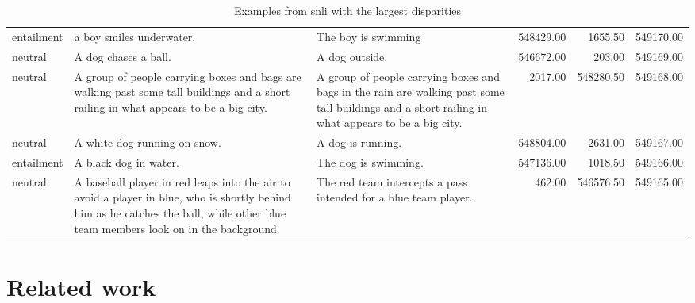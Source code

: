 \documentclass[letterpaper]{article} %
\begin{document}
\begin{table*}[ht]
\begin{tabular}{lp{4cm}p{4cm}rrr}
		entailment & a boy smiles underwater. & The boy is swimming & 548429.00 & 1655.50 & 549170.00 \\ 
		neutral & A dog chases a ball. & A dog outside. & 546672.00 & 203.00 & 549169.00 \\ 
		neutral & A group of people carrying boxes and bags are walking past some tall buildings and a short railing in what appears to be a big city. & A group of people carrying boxes and bags in the rain are walking past some tall buildings and a short railing in what appears to be a big city. & 2017.00 & 548280.50 & 549168.00 \\ 
		neutral & A white dog running on snow. & A dog is running. & 548804.00 & 2631.00 & 549167.00 \\ 
		entailment & A black dog in water. & The dog is swimming. & 547136.00 & 1018.50 & 549166.00 \\ 
		neutral & A baseball player in red leaps into the air to avoid a player in blue, who is shortly behind him as he catches the ball, while other blue team members look on in the background. & The red team intercepts a pass intended for a blue team player. & 462.00 & 546576.50 & 549165.00 \\ 
		\hline
	\end{tabular}
	\caption{Examples from snli with the largest disparities} 
	\label{tab:differences_snli}
\end{table*}


\begin{comment} 
\subsection{Performance by Difficulty}
Does using DCL-IRT for training lead to a more interpretable output in terms of test set performance?
That is, when a curriculum is employed, does the model perform better on easier test examples than difficult ones?
A comparison of methods on test data binned by difficulty shows that model performance is similar when test set difficulty is taken into account (Figure XX).
The main difference is that for the baseline models, performance is stratified by difficulty almost immediately, and there are small improvements across groups during training, while for the CL methods, there is consistent improvement across groups as training continues, and more data is added. 
\end{comment} 

\section{Related work}
\end{document}

